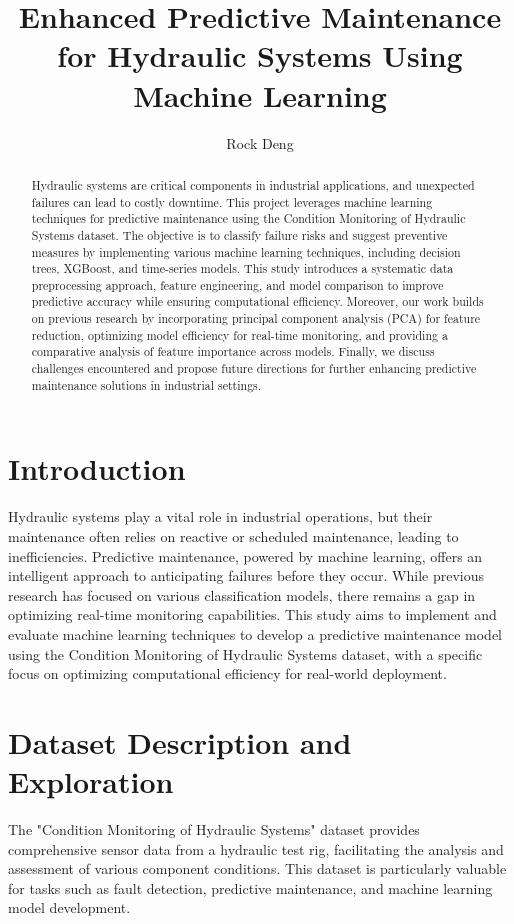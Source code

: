 \documentclass[sigconf]{acmart}
\title{Enhanced Predictive Maintenance for Hydraulic Systems Using Machine Learning}
\author{Rock Deng}
\affiliation{%
  \institution{University of Colorado Boulder}}
\begin{document}
\begin{abstract}
Hydraulic systems are critical components in industrial applications, and unexpected failures can lead to costly downtime. This project leverages machine learning techniques for predictive maintenance using the Condition Monitoring of Hydraulic Systems dataset. The objective is to classify failure risks and suggest preventive measures by implementing various machine learning techniques, including decision trees, XGBoost, and time-series models. This study introduces a systematic data preprocessing approach, feature engineering, and model comparison to improve predictive accuracy while ensuring computational efficiency. Moreover, our work builds on previous research by incorporating principal component analysis (PCA) for feature reduction, optimizing model efficiency for real-time monitoring, and providing a comparative analysis of feature importance across models. Finally, we discuss challenges encountered and propose future directions for further enhancing predictive maintenance solutions in industrial settings.
\end{abstract}

\maketitle

\section{Introduction}
Hydraulic systems play a vital role in industrial operations, but their maintenance often relies on reactive or scheduled maintenance, leading to inefficiencies. Predictive maintenance, powered by machine learning, offers an intelligent approach to anticipating failures before they occur. While previous research has focused on various classification models, there remains a gap in optimizing real-time monitoring capabilities. This study aims to implement and evaluate machine learning techniques to develop a predictive maintenance model using the Condition Monitoring of Hydraulic Systems dataset, with a specific focus on optimizing computational efficiency for real-world deployment.


\section{Dataset Description and Exploration} 
The "Condition Monitoring of Hydraulic Systems" dataset provides comprehensive sensor data from a hydraulic test rig, facilitating the analysis and assessment of various component conditions. This dataset is particularly valuable for tasks such as fault detection, predictive maintenance, and machine learning model development.
\end{document}
